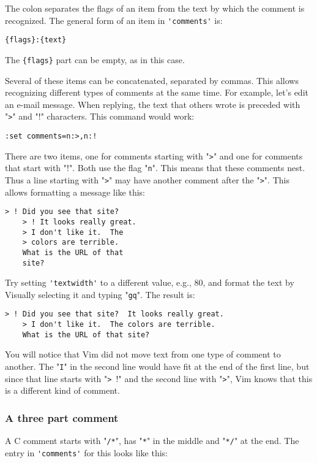 The colon separates the flags of an item from the text by which the comment is recognized.
The general form of an item in \verb!'comments'! is:

\begin{Verbatim}[samepage=true]
    {flags}:{text}
\end{Verbatim}

The \verb!{flags}! part can be empty, as in this case.

Several of these items can be concatenated, separated by commas.
This allows recognizing different types of comments at the same time.
For example, let's edit an e-mail message.
When replying, the text that others wrote is preceded with "\verb!>!" and "\verb!!!" characters.
This command would work:

\begin{Verbatim}[samepage=true]
 :set comments=n:>,n:!
\end{Verbatim}

There are two items, one for comments starting with "\verb!>!" and one for comments that start with "\verb!!!".
Both use the flag "\verb!n!".
This means that these comments nest.
Thus a line starting with "\verb!>!" may have another comment after the "\verb!>!".
This allows formatting a message like this:

\begin{Verbatim}[samepage=true]
    > ! Did you see that site? 
    > ! It looks really great. 
    > I don't like it.  The 
    > colors are terrible. 
    What is the URL of that 
    site? 
\end{Verbatim}

Try setting \verb!'textwidth'! to a different value, e.g., 80, and format the text by Visually selecting it and typing "\verb!gq!".
The result is:

\begin{Verbatim}[samepage=true]
    > ! Did you see that site?  It looks really great. 
    > I don't like it.  The colors are terrible. 
    What is the URL of that site? 
\end{Verbatim}

You will notice that Vim did not move text from one type of comment to another.
The "\verb!I!" in the second line would have fit at the end of the first line, but since that line starts with "\verb!> !!" and the second line with "\verb!>!", Vim knows that this is a different kind of comment.

\subsubsection{A three part comment}
A C comment starts with "\verb!/*!", has "\verb!*!" in the middle and "\verb!*/!" at the end.
The entry in \verb!'comments'! for this looks like this:

